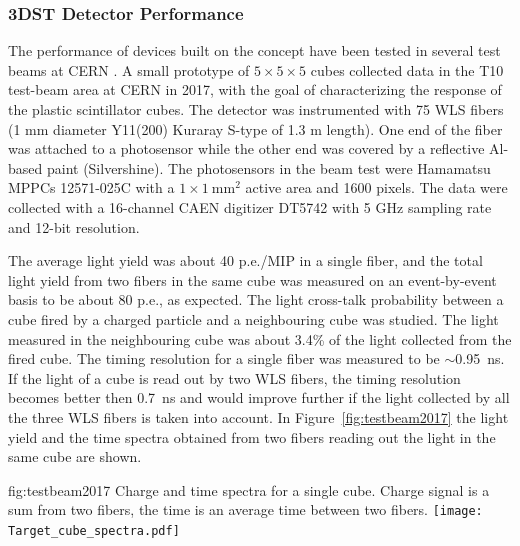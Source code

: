 \subsubsection{3DST Detector Performance}

The performance of devices built on the  concept have been tested in several test beams at CERN \cite{Mineev:2018ekk}.
A small prototype of $5\times5\times5$ cubes collected data in the T10 test-beam area at CERN in 2017, with the goal of characterizing the response of the plastic scintillator cubes.
The detector was instrumented with 75 WLS fibers (1 mm diameter Y11(200) Kuraray S-type of 1.3 m length). One end of the fiber was attached to a photosensor while the other end was covered by a reflective Al-based paint (Silvershine). The photosensors in the beam test were Hamamatsu MPPCs 12571-025C with a $1\times1~\text{mm}^2$ active area and 1600 pixels. The data were collected with a 16-channel CAEN digitizer DT5742 with 5 GHz sampling rate and 12-bit resolution.

The average light yield was about 40 p.e./MIP in a single fiber, and the total light yield from two fibers in the same cube was measured on an event-by-event basis to be about 80 p.e., as expected.
The light cross-talk probability between a cube fired by a charged particle and a neighbouring cube was studied. The light measured in the neighbouring cube was about 3.4\% of the light collected from the fired cube. 
The timing resolution for a single fiber was measured to be $\sim$0.95~ns. If the light of a cube is read out by two WLS fibers, the timing resolution becomes better then 0.7~ns and would improve further if the light collected by all the three WLS fibers is taken into account.
In Figure~\ref{fig:testbeam2017} the light yield and the time spectra obtained from two fibers reading out the light in the same cube are shown.

\begin{dunefigure}{fig:testbeam2017}
{Charge and time spectra for a single cube. Charge signal is a sum from two fibers, the time is an average time between two fibers.}
  \texttt{[image: Target\_cube\_spectra.pdf]}
\end{dunefigure}

